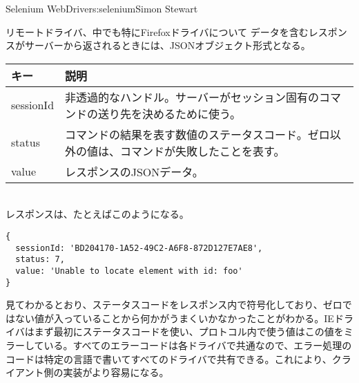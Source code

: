 \begin{aosachapter}{Selenium WebDriver}{s:selenium}{Simon Stewart}
\begin{aosasect1}{リモートドライバ、中でも特にFirefoxドライバについて}
データを含むレスポンスがサーバーから返されるときには、JSONオブジェクト形式となる。

\begin{tabular}{|lp{4in}|}
\hline
キー & 説明 \\
\hline
sessionId & 非透過的なハンドル。サーバーがセッション固有のコマンドの送り先を決めるために使う。\\
status & コマンドの結果を表す数値のステータスコード。ゼロ以外の値は、コマンドが失敗したことを表す。\\
value & レスポンスのJSONデータ。\\
\hline
\end{tabular}

~\\

\noindent
レスポンスは、たとえばこのようになる。

\begin{verbatim}
{
  sessionId: 'BD204170-1A52-49C2-A6F8-872D127E7AE8',
  status: 7,
  value: 'Unable to locate element with id: foo'
}
\end{verbatim}

\noindent 見てわかるとおり、ステータスコードをレスポンス内で符号化しており、ゼロではない値が入っていることから何かがうまくいかなかったことがわかる。IEドライバはまず最初にステータスコードを使い、プロトコル内で使う値はこの値をミラーしている。すべてのエラーコードは各ドライバで共通なので、エラー処理のコードは特定の言語で書いてすべてのドライバで共有できる。これにより、クライアント側の実装がより容易になる。


\end{aosasect1}
\end{aosachapter}
